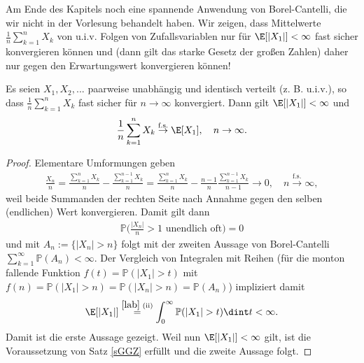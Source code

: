 Am Ende des Kapitels noch eine spannende Anwendung von Borel-Cantelli, die wir nicht in der Vorlesung behandelt haben. Wir zeigen, dass Mittelwerte $\frac 1 n \sum_{k=1}^n X_k$ von u.i.v. Folgen von Zufallsvariablen nur f\"ur $\E[|X_1|]<\infty$ fast sicher konvergieren k\"onnen und (dann gilt das starke Gesetz der gro\ss en Zahlen) daher nur gegen den Erwartungswert konvergieren k\"onnen!
\begin{satz}
	Es seien $X_1,X_2,...$ paarweise unabh\"angig und identisch verteilt (z. B. u.i.v.), so dass $\frac 1 n \sum_{k=1}^n X_k$ fast sicher f\"ur $n\to\infty$ konvergiert. Dann gilt $\E[|X_1|]<\infty$ und 
	\begin{align*}
		\frac 1 n \sum_{k=1}^n X_k \overset{\text{f.s.}}{\to} \E[X_1],\quad n\to\infty.
	\end{align*}	 
\end{satz}
\begin{proof}
Elementare Umformungen geben
\begin{align*}
	\frac{X_n}{n}=\frac{\sum_{k=1}^n X_k}{n}-\frac{\sum_{k=1}^{n-1}X_k}{n}= \frac{\sum_{k=1}^nX_k}{n}-\frac{n-1}{n} \frac{\sum_{k=1}^{n-1}X_k}{n-1}\to 0,\quad n\overset{\text{f.s.}}{\to}\infty,
\end{align*}
weil beide Summanden der rechten Seite nach Annahme gegen den selben (endlichen) Wert konvergieren. Damit gilt dann 
\begin{align*}
	\mathbb P\Big(\frac{|X_n|}{n}>1\text{ unendlich oft}\Big)=0
\end{align*}
und mit $A_n:=\{|X_n|>n\}$ folgt mit der zweiten Aussage von Borel-Cantelli $\sum_{k=1}^\infty \mathbb P(A_n)<\infty.$ Der Vergleich von Integralen mit Reihen (f\"ur die monton fallende Funktion $f(t)=\mathbb P(|X_1|>t)$ mit $f(n)=\mathbb P(|X_1|>n)=\mathbb P(|X_n|>n)=\mathbb P(A_n)$) impliziert damit 
\begin{align*}
	\E[|X_1|]\overset{\ref{lab}\text{ (ii)}}{=}\int_0^\infty \mathbb P(|X_1|>t)\dint t<\infty.
\end{align*}
Damit ist die erste Aussage gezeigt. Weil nun $\E[|X_1|]<\infty$ gilt, ist die Voraussetzung von Satz \ref{sGGZ} erf\"ullt und die zweite Aussage folgt.
\end{proof}


